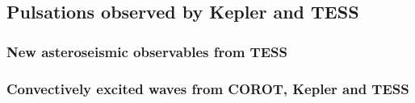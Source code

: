 {\color{blue}
\subsection{Pulsations observed by Kepler and TESS}


\subsubsection{New asteroseismic observables from TESS}

\subsubsection{Convectively excited waves from COROT, Kepler and TESS}


}